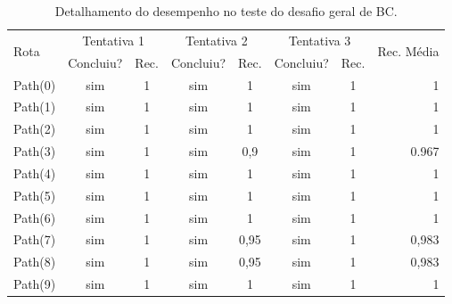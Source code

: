 \begin{table}[htpb]
    \centering
    \caption{Detalhamento do desempenho no teste do desafio geral de BC.}
    \label{resultado-tabela-geral-bc}
    \begin{tabular}{|l|c|c|c|c|c|c|r|}
         \hline
         \multirow{2}{*}{Rota} & \multicolumn{2}{c|}{Tentativa 1}  & \multicolumn{2}{c|}{Tentativa 2} & \multicolumn{2}{c|}{Tentativa 3} & \multirow{2}{*}{Rec. Média} \\ \cline{2-7}
                               & \small{Concluiu?}  & \small{Rec.} & \small{Concluiu?} &\small{Rec.} & \small{Concluiu?} &\small{Rec.} &                               \\ \hline
            Path(0)   &      sim        &   1             &    sim          &      1        &    sim          &      1        &      1                 \\ \hline
            Path(1)   &      sim        &   1             &    sim          &      1        &    sim          &      1        &      1                 \\ \hline
            Path(2)   &      sim        &   1             &    sim          &      1        &    sim          &      1        &      1                 \\ \hline
            Path(3)   &      sim        &   1             &    sim          &      0,9      &    sim          &      1        &      0.967             \\ \hline
            Path(4)   &      sim        &   1             &    sim          &      1        &    sim          &      1        &      1                 \\ \hline
            Path(5)   &      sim        &   1             &    sim          &      1        &    sim          &      1        &      1                 \\ \hline
            Path(6)   &      sim        &   1             &    sim          &      1        &    sim          &      1        &      1                 \\ \hline
            Path(7)   &      sim        &   1             &    sim          &      0,95     &    sim          &      1        &      0,983             \\ \hline
            Path(8)   &      sim        &   1             &    sim          &      0,95     &    sim          &      1        &      0,983             \\ \hline
            Path(9)   &      sim        &   1             &    sim          &      1        &    sim          &      1        &      1                 \\ \hline

\end{tabular}
\end{table}

